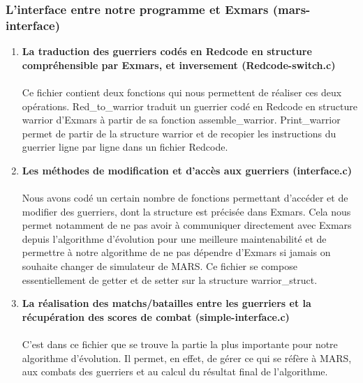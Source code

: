 \documentclass[french]{article}
\begin{document}
        \subsubsection{L'interface entre notre programme et Exmars (mars-interface)}
            \begin{enumerate}
                \item \textbf{La traduction des guerriers codés en Redcode en structure compréhensible par Exmars, et inversement (Redcode-switch.c)}
                    \paragraph{} Ce fichier contient deux fonctions qui nous permettent de réaliser ces deux opérations. Red\_to\_warrior traduit un guerrier codé en Redcode en structure warrior d'Exmars à partir de sa fonction assemble\_warrior. Print\_warrior permet de partir de la structure warrior et de recopier les instructions du guerrier ligne par ligne dans un fichier Redcode. 
                    \bigskip
                
                \item \textbf {Les méthodes de modification et d'accès aux guerriers (interface.c)}
                    \paragraph{} Nous avons codé un certain nombre de fonctions permettant d'accéder et de modifier des guerriers, dont la structure est précisée dans Exmars. Cela nous permet notamment de ne pas avoir à communiquer directement avec Exmars depuis l'algorithme d'évolution pour une meilleure maintenabilité et de permettre à notre algorithme de ne pas dépendre d'Exmars si jamais on souhaite changer de simulateur de MARS. Ce fichier se compose essentiellement de getter et de setter sur la structure warrior\_struct. 
                    \bigskip
                
                \item  \textbf {La réalisation des matchs/batailles entre les guerriers et la récupération des scores de combat (simple-interface.c)}
                    \paragraph{} C'est dans ce fichier que se trouve la partie la plus importante pour notre algorithme d'évolution. Il permet, en effet, de gérer ce qui se réfère à MARS, aux combats des guerriers et au calcul du résultat final de l'algorithme. 
                    \bigskip
                    

\end{enumerate}
\end{document}
